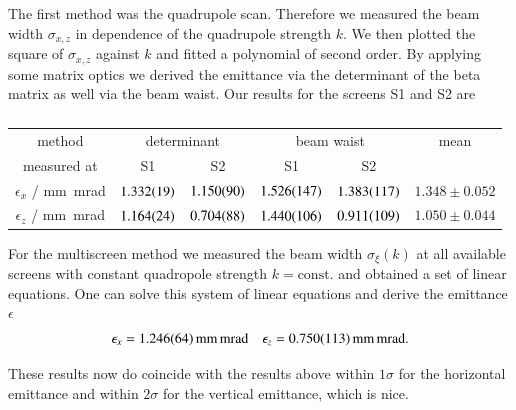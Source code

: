\documentclass[11pt,a4paper,notitlepage]{scrartcl}
\begin{document}
The first method was the quadrupole scan. Therefore we measured the beam width $\sigma_{x,z}$ in dependence of the quadrupole strength $k$. We then plotted the square of $\sigma_{x,z}$ against $k$ and fitted a polynomial of second order. By applying some matrix optics we derived the emittance via the determinant of the beta matrix as well via the beam waist. Our results for the screens S1 and S2 are
\begin{table}[H]
	\centering
	\begin{tabular}{c||cc|cc||c}
		
		method&\multicolumn{2}{c|}{determinant} & \multicolumn{2}{c||}{beam waist}& mean\\
		measured at&S1 & S2& S1 & S2&\\
		\hline
		$\epsilon_{x}$ / \si{\milli\m\milli\radian} &$\SI{1.332\pm0.019}{}$&$\SI{1.150\pm0.090}{}$&$\SI{1.526\pm0.147}{}$&$\SI{1.383\pm0.117}{}$&$1.348\pm0.052$\\
		\hline
		\hline
		$\epsilon_{z}$ / \si{\milli\m\milli\radian} &$\SI{1.164\pm0.024}{}$&$\SI{0.704\pm0.088}{}$&$\SI{1.440\pm0.106}{}$&$\SI{0.911\pm0.109}{}$&$1.050\pm0.044$\\
		
	\end{tabular}
	
	\caption*{}
\end{table}

For the multiscreen method we measured the beam width $\sigma_\xi(k)$ at all available screens with constant quadropole strength $k=\text{const.}$ and obtained a set of linear equations. One can solve this system of linear equations and derive the emittance $\epsilon$
\begin{align*}
\epsilon_{x}=\SI{1.246\pm0.064}{\milli\m\milli\radian}  && \epsilon_{z}=\SI{0.750\pm0.113}{\milli\m\milli\radian}.
\end{align*}

These results now do coincide with the results above within $1\sigma$ for the horizontal emittance and within $2\sigma$ for the vertical emittance, which is nice. 
\end{document}
